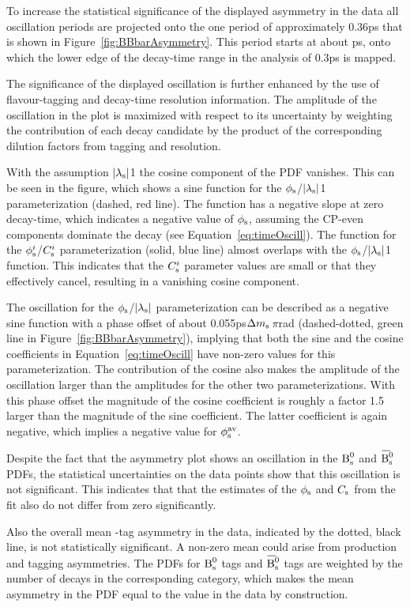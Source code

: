 To increase the statistical significance of the displayed asymmetry in the data all oscillation periods are projected onto the one period
of approximately 0.36\unitsp{}ps that is shown in Figure~\ref{fig:BBbarAsymmetry}. This period starts at about \unitsp{}ps, onto
which the lower edge of the decay-time range in the analysis of 0.3\unitsp{}ps is mapped.

The significance of the displayed oscillation is further enhanced by the use of flavour-tagging and decay-time resolution information.
The amplitude of the oscillation in the plot is maximized with respect to its uncertainty by weighting the contribution of each decay
candidate by the product of the corresponding dilution factors from tagging and resolution.

With the assumption $|{\lambda_{\text{s}}}|$\texteq{}1 the cosine component of the PDF vanishes. This can be seen in the figure, which shows a sine
function for the $\phi_\text{s}$/$|{\lambda_{\text{s}}}|$\texteq{}1 parameterization (dashed, red line). The function has a negative slope at zero decay-time,
which indicates a negative value of $\phi_\text{s}$, assuming the CP-even components dominate the decay (see Equation~\ref{eq:timeOscill}). The
function for the $\phi_\text{s}^{i}$/$C_\text{s}^{i}$ parameterization (solid, blue line) almost overlaps with the $\phi_\text{s}$/$|{\lambda_{\text{s}}}|$\texteq{}1 function. This
indicates that the $C_\text{s}^{i}$ parameter values are small or that they effectively cancel, resulting in a vanishing cosine component.

The oscillation for the $\phi_\text{s}$/$|{\lambda_{\text{s}}}|$ parameterization can be described as a negative sine function with a phase offset of about
0.055\unitsp{}ps\textcdot$\Delta m_\text{s}$$\,\pi$\unitsp{}rad (dashed-dotted, green line in Figure~\ref{fig:BBbarAsymmetry}), implying
that both the sine and the cosine coefficients in Equation~\ref{eq:timeOscill} have non-zero values for this parameterization. The
contribution of the cosine also makes the amplitude of the oscillation larger than the amplitudes for the other two parameterizations. With
this phase offset the magnitude of the cosine coefficient is roughly a factor 1.5 larger than the magnitude of the sine coefficient. The
latter coefficient is again negative, which implies a negative value for $\phi_\text{s}^{\text{av}}$.

Despite the fact that the asymmetry plot shows an oscillation in the $\text{B}_\text{s}^\text{0}$ and $\Bsbar$ PDFs, the statistical uncertainties on the data
points show that this oscillation is not significant. This indicates that that the estimates of the $\phi_\text{s}$ and $C_\text{s}$ from the fit also do
not differ from zero significantly.

Also the overall mean \BsBsbar-tag asymmetry in the data, indicated by the dotted, black line, is not statistically significant. A non-zero
mean could arise from production and tagging asymmetries. The PDFs for $\text{B}_\text{s}^\text{0}$ tags and $\Bsbar$ tags are weighted by the number of decays in
the corresponding category, which makes the mean asymmetry in the PDF equal to the value in the data by construction.
